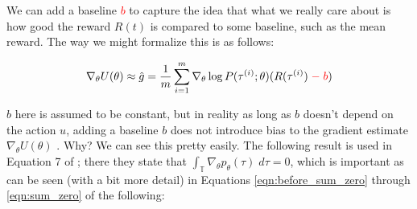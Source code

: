 \documentclass[11pt, oneside]{article}   	%
\begin{document}
\bigskip
\noindent
We can add a baseline \textcolor{red}{$b$} to capture the idea that what we really care about is how good the reward $R(t)$ is compared to some baseline, such as the mean reward. 
The way we might formalize this is as follows:

\begin{equation}
\nabla_\theta U(\theta) \approx \hat{g} = \frac{1}{m} \sum\limits_{i = 1}^{m} \nabla_{\theta} \log  P(\tau^{(i)} ; \theta) (R(\tau^{(i)}) \textcolor{red}{\;-\;  b})
\end{equation}

\bigskip
\noindent
$b$ here is assumed to be constant, but in reality as long as $b$ doesn't depend on the action $u$, adding a baseline $b$ does not introduce bias to the gradient estimate 
$\nabla_{\theta} U(\theta)$ \cite{Williams1992}. Why? We can see this pretty easily. The following result is used in Equation 7 of  
\cite{Peters:2006fk}; there they state that $\int_{\mathbb{T}} \nabla_{\theta} p_{\theta}(\tau) \; d\tau = 0$, which is important as
can be seen (with a bit more detail) in Equations \ref{eqn:before_sum_zero} through \ref{eqn:sum_zero} of the following:
\end{document}
